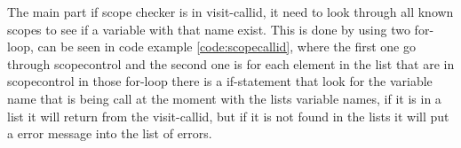 The main part if scope checker is in visit-callid, it need to look through all known scopes to see if a variable with that name exist. This is done by using two for-loop, can be seen in code example \ref{code:scopecallid}, where the first one go through scopecontrol and the second one is for each element in the list that are in scopecontrol in those for-loop there is a if-statement that look for the variable name that is being call at the moment with the lists variable names, if it is in a list it will return from the visit-callid, but if it is not found in the lists it will put a error message into the list of errors.

